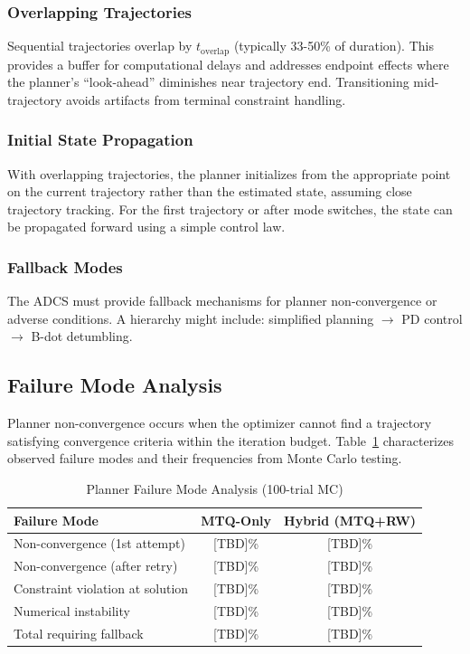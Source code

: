 \documentclass[conference]{IEEEtran}
\begin{document}
\subsubsection{Overlapping Trajectories}\label{subsubsec:overlap}
Sequential trajectories overlap by $t_{\text{overlap}}$ (typically 33-50\% of duration). This provides a buffer for computational delays and addresses endpoint effects where the planner's ``look-ahead'' diminishes near trajectory end. Transitioning mid-trajectory avoids artifacts from terminal constraint handling.

\subsubsection{Initial State Propagation}\label{subsubsec:init_state}
With overlapping trajectories, the planner initializes from the appropriate point on the current trajectory rather than the estimated state, assuming close trajectory tracking. For the first trajectory or after mode switches, the state can be propagated forward using a simple control law.

\subsubsection{Fallback Modes}\label{subsubsec:fallback}
The ADCS must provide fallback mechanisms for planner non-convergence or adverse conditions. A hierarchy might include: simplified planning $\rightarrow$ PD control $\rightarrow$ B-dot detumbling.

\subsection{Failure Mode Analysis}\label{subsec:failure_modes}

Planner non-convergence occurs when the optimizer cannot find a trajectory satisfying convergence criteria within the iteration budget. Table~\ref{tab:failure_modes} characterizes observed failure modes and their frequencies from Monte Carlo testing.

\begin{table}[t]
    \centering
    \caption{Planner Failure Mode Analysis (100-trial MC)}
    \label{tab:failure_modes}
    \begin{tabular}{lcc}
        \toprule
        Failure Mode & MTQ-Only & Hybrid (MTQ+RW) \\
        \midrule
        Non-convergence (1st attempt) & [TBD]\% & [TBD]\% \\
        Non-convergence (after retry) & [TBD]\% & [TBD]\% \\
        Constraint violation at solution & [TBD]\% & [TBD]\% \\
        Numerical instability & [TBD]\% & [TBD]\% \\
        \midrule
        Total requiring fallback & [TBD]\% & [TBD]\% \\
        \bottomrule
    \end{tabular}
\end{table}
\end{document}
